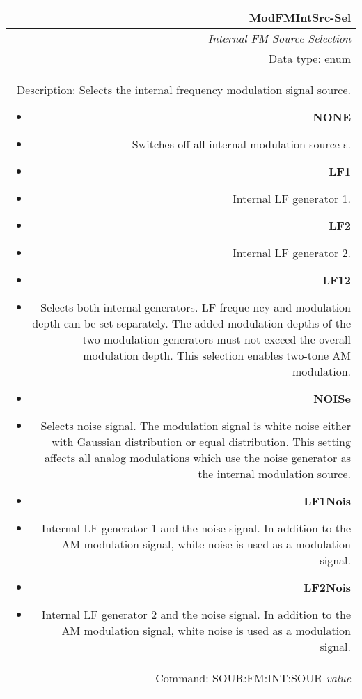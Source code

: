 \documentclass[openany]{article}
\begin{document}
		\begin{tabular}{N}
			\hline
			\bfseries ModFMIntSrc-Sel \\ \hline
			\emph{Internal FM Source Selection} \\
			Data type: enum \\  
			Description: Selects the internal frequency modulation signal source.\begin{itemize}[noitemsep]
				\small
				\item[] \textbf{NONE}
                                \item[] Switches off all internal modulation source     s.
                                \item[] \textbf{LF1}
                                \item[] Internal LF generator 1.
                                \item[] \textbf{LF2}
                                \item[] Internal LF generator 2.
                                \item[] \textbf{LF12}
                                \item[] Selects both internal generators. LF freque     ncy and modulation depth can be set separately. The added modulation depths of the two modulation generators must not exceed the overall modulation depth. This selection enables two-tone AM modulation.
                                \item[] \textbf{NOISe}
                                \item[] Selects noise signal. The modulation signal      is white noise either with Gaussian distribution or equal distribution. This setting affects all analog modulations which use the noise generator as the internal modulation source.
                                \item[] \textbf{LF1Nois}
                                \item[] Internal LF generator 1 and the noise signal. In addition to the AM modulation signal, white noise is used as a modulation signal.
                                \item[] \textbf{LF2Nois}
                                \item[] Internal LF generator 2 and the noise signal. In addition to the AM modulation signal, white noise is used as a modulation signal.
			\end{itemize} \\
			Command: SOUR:FM:INT:SOUR \emph{value} \\
			\\

		\end{tabular}
\end{document}
